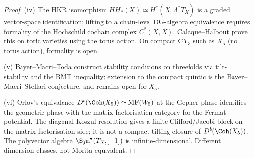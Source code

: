 \begin{proof}
(iv) The HKR isomorphism $HH_*(X)\simeq H^*(X,\Lambda^* T_X)$
\cite{Caldararu2003} is a graded vector-space identification; lifting to a
chain-level DG-algebra equivalence requires formality of the Hochschild
cochain complex $C^*(X,X)$. Calaque--Halbout \cite{CalaqueHalbout2011}
prove this on toric varieties using the torus action. On compact CY$_3$
such as $X_5$ (no torus action), formality is open.

(v) Bayer--Macri--Toda \cite{BayerMacriToda2014} construct stability
conditions on threefolds via tilt-stability and the BMT inequality;
extension to the compact quintic is the Bayer--Macri--Stellari conjecture,
and remains open for \(X_5\).

(vi) Orlov's equivalence $D^b(\Coh(X_5))\simeq \mathrm{MF}(W_5)$ at the
Gepner phase identifies the geometric phase with the matrix-factorisation
category for the Fermat potential. The diagonal Koszul resolution gives
a finite Clifford/Jacobi block on the matrix-factorisation side; it is
not a compact tilting closure of $D^b(\Coh(X_5))$. The polyvector algebra
$\Sym^\bullet(T_{X_5}[-1])$ is infinite-dimensional. Different dimension
classes, not Morita equivalent.
\end{proof}


